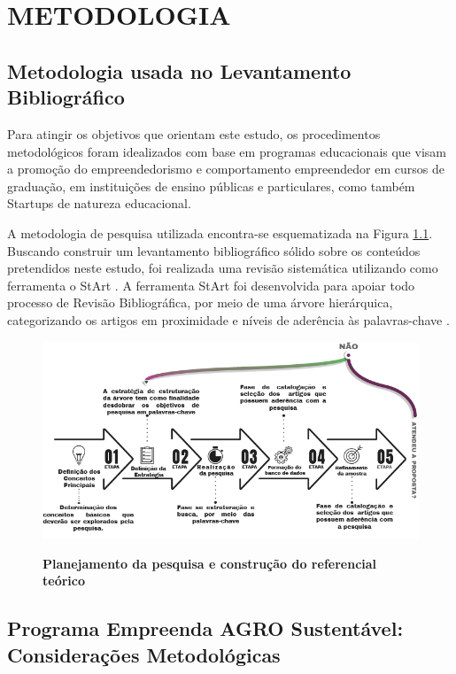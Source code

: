 \chapter{METODOLOGIA}

\section{Metodologia usada no Levantamento Bibliográfico}


Para atingir os objetivos que orientam este estudo, os procedimentos metodológicos foram idealizados com base em programas educacionais que visam a promoção do empreendedorismo e comportamento empreendedor em cursos de graduação, em instituições de ensino públicas e particulares, como também Startups de natureza educacional.


A metodologia de pesquisa utilizada encontra-se esquematizada na Figura \ref{figura_29}. Buscando construir um levantamento bibliográfico sólido sobre os conteúdos pretendidos neste estudo, foi realizada uma revisão sistemática utilizando como ferramenta o StArt \cite{lapes_start_2016}. A ferramenta StArt foi desenvolvida para apoiar todo processo de Revisão Bibliográfica, por meio de uma árvore hierárquica, categorizando os artigos em proximidade e níveis de aderência às palavras-chave \cite{hernandes_avaliacao_2010}.


\begin{figure}[H]
\centering
\caption{\textbf{Planejamento da pesquisa e construção do referencial teórico}}
\includegraphics[scale=0.6]{Imagens/fases_pesquisa_bibliografica.png}
\label{figura_29}
\end{figure}

\section{Programa Empreenda AGRO Sustentável: Considerações Metodológicas}


